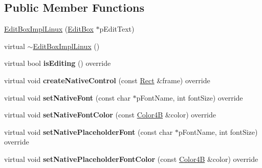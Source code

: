 \subsection*{Public Member Functions}
\begin{DoxyCompactItemize}
\item 
\hyperlink{classui_1_1EditBoxImplLinux_a1547fb366cb608504b34087736432c76}{Edit\+Box\+Impl\+Linux} (\hyperlink{classui_1_1EditBox}{Edit\+Box} $\ast$p\+Edit\+Text)
\item 
virtual \hyperlink{classui_1_1EditBoxImplLinux_a60d400c6cd14bfc8df2e23a61f0ca5cf}{$\sim$\+Edit\+Box\+Impl\+Linux} ()
\item 
\mbox{\label{classui_1_1EditBoxImplLinux_a84e9779f7fde8f117e1c1a435068931d}} 
virtual bool {\bfseries is\+Editing} () override
\item 
\mbox{\label{classui_1_1EditBoxImplLinux_ad25198f149f11eb3fb25d2fdedc6d326}} 
virtual void {\bfseries create\+Native\+Control} (const \hyperlink{classRect}{Rect} \&frame) override
\item 
\mbox{\label{classui_1_1EditBoxImplLinux_a23c7932904904d3475cd289943890083}} 
virtual void {\bfseries set\+Native\+Font} (const char $\ast$p\+Font\+Name, int font\+Size) override
\item 
\mbox{\label{classui_1_1EditBoxImplLinux_a319fe00d9b8c5b3831a298c3cf21baf8}} 
virtual void {\bfseries set\+Native\+Font\+Color} (const \hyperlink{structColor4B}{Color4B} \&color) override
\item 
\mbox{\label{classui_1_1EditBoxImplLinux_a1a26f48cb778a71b0ed3f5a54ef42cd0}} 
virtual void {\bfseries set\+Native\+Placeholder\+Font} (const char $\ast$p\+Font\+Name, int font\+Size) override
\item 
\mbox{\label{classui_1_1EditBoxImplLinux_a6176c03b6986b5fae3a115adc7784bc6}} 
virtual void {\bfseries set\+Native\+Placeholder\+Font\+Color} (const \hyperlink{structColor4B}{Color4B} \&color) override
\item 
\mbox{\label{classui_1_1EditBoxImplLinux_a4aee0282f3087467c90df15a7dd72450}} 

\end{DoxyCompactItemize}
